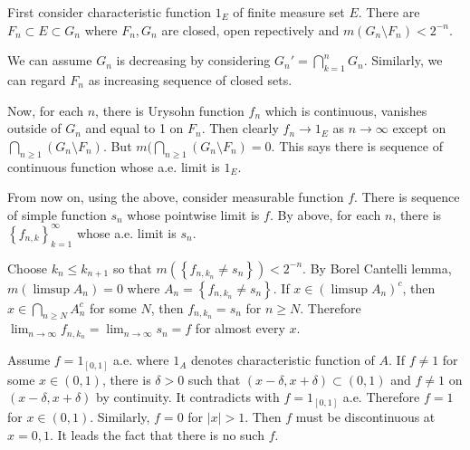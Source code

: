 \begin{problem}[1.18] \hfill

	First consider characteristic function $1_E$ of finite measure set $E$. There are $F_n \subset E \subset G_n$ where $F_n, G_n$ are closed, open repectively and $m(G_n \setminus F_n) < 2^{-n}$.
	
	We can assume $G_n$ is decreasing by considering $G_n' = \bigcap_{k=1}^n G_n$. Similarly, we can regard $F_n$ as increasing sequence of closed sets.

	Now, for each $n$, there is Urysohn function $f_n$ which is continuous, vanishes outside of $G_n$ and equal to 1 on $F_n$. Then clearly $f_n \rightarrow 1_E$ as $n \rightarrow \infty$ except on $\bigcap_{n\geq 1}\left( G_n \setminus F_n \right)$. But $m(\bigcap_{n\geq 1}\left( G_n \setminus F_n \right) = 0$. This says there is sequence of continuous function whose a.e. limit is $1_E$.

		From now on, using the above, consider measurable function $f$. There is sequence of simple function $s_n$ whose pointwise limit is $f$. By above, for each $n$, there is $\left\{ f_{n, k} \right\}_{k=1}^\infty$ whose a.e. limit is $s_n$.
		
		Choose $k_n\leq k_{n+1}$ so that $m(\left\{ f_{n, k_n} \ne s_n \right\}) < 2^{-n}$. By Borel Cantelli lemma, $m(\limsup A_n) = 0$ where $A_n = \left\{ f_{n, k_n} \ne s_n \right\}$. 
		If $x \in \left( \limsup A_n \right)^c$, then $x \in \bigcap_{n \geq N} A_n^c$ for some $N$, then $f_{n, k_n} = s_n$ for $n \geq N$. Therefore $\lim_{n\rightarrow \infty} f_{n, k_n} = \lim_{n\rightarrow \infty} s_n = f$ for almost every $x$.
\end{problem}

\begin{problem}[1.22] \hfill

	Assume $f = 1_{[0, 1]}$ a.e. where $1_A$ denotes characteristic function of $A$.
	If $f \ne 1$ for some $ x \in (0, 1)$, there is $\delta >0$ such that $(x-\delta, x+\delta) \subset (0, 1)$ and $f \ne 1$ on $(x-\delta, x+\delta)$ by continuity.
	It contradicts with $f = 1_{[0, 1]}$ a.e. Therefore $f = 1 $ for $x \in \left( 0, 1 \right)$. Similarly, $f = 0$ for $|x| > 1$. Then $f$ must be discontinuous at $x = 0, 1$. It leads the fact that there is no such $f$.

\end{problem}

